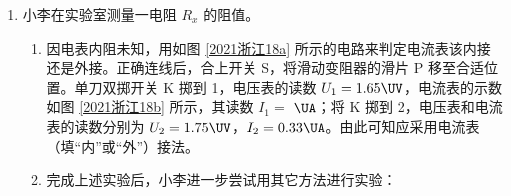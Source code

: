\documentclass[\gkver]{gaokaozhenti}
\begin{document}
\begin{enumerate}
\begin{enumerate}[label=\protect\Circled{\arabic*}]
	（A）旋转测量头　　（B）增大单缝与双缝间的距离　　（C）调节拨杆使单缝与双缝平行
	\item
	要增大观察到的条纹间距，正确的做法是 （单选）

	（A）减小单缝与光源间的距离　　（B）减小单缝与双缝间的距离

	（C）增大透镜与单缝间的距离　　（D）增大双缝与测量头间的距离
\end{enumerate}



\item
小李在实验室测量一电阻 $R_x$ 的阻值。

\begin{enumerate}
	\item
	因电表内阻未知，用如图 \ref{2021浙江18a} 所示的电路来判定电流表该内接还是外接。正确连线后，合上开关 S，将滑动变阻器的滑片 P 移至合适位置。单刀双掷开关 K 掷到 1，电压表的读数 $U_1=1.65\UV$，电流表的示数如图 \ref{2021浙江18b} 所示，其读数 $I_1=$ $\UA$；将 K 掷到 2，电压表和电流表的读数分别为 $U_2=1.75\UV$，$I_2=0.33\UA$。由此可知应采用电流表 （填“内”或“外”）接法。
	\item
	完成上述实验后，小李进一步尝试用其它方法进行实验：
\end{enumerate}


\end{enumerate}
\end{document}
